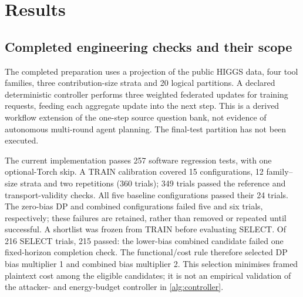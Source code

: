 \section{Results}\label{sec:results}

\subsection{Completed engineering checks and their scope}\label{sec:engineering}
The completed preparation uses a projection of the public HIGGS data, four tool families, three contribution-size strata and 20 logical partitions. A declared deterministic controller performs three weighted federated updates for training requests, feeding each aggregate update into the next step. This is a derived workflow extension of the one-step source question bank, not evidence of autonomous multi-round agent planning. The final-test partition has not been executed.

The current implementation passes 257 software regression tests, with one optional-Torch skip. A TRAIN calibration covered 15 configurations, 12 family--size strata and two repetitions (360 trials); 349 trials passed the reference and transport-validity checks. All five baseline configurations passed their 24 trials. The zero-bias DP and combined configurations failed five and six trials, respectively; these failures are retained, rather than removed or repeated until successful. A shortlist was frozen from TRAIN before evaluating SELECT. Of 216 SELECT trials, 215 passed: the lower-bias combined candidate failed one fixed-horizon completion check. The functional/cost rule therefore selected DP bias multiplier 1 and combined bias multiplier 2. This selection minimises framed plaintext cost among the eligible candidates; it is not an empirical validation of the attacker- and energy-budget controller in \cref{alg:controller}.


